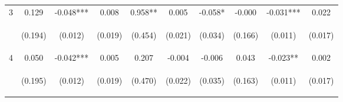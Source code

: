 \begin{tabular}{lccccccccc}
\noalign{\smallskip}3 & 0.129 & -0.048*** & 0.008 & 0.958** & 0.005 & -0.058* & -0.000 & -0.031*** & 0.022\\
 & \begin{footnotesize}(0.194)\end{footnotesize} & \begin{footnotesize}(0.012)\end{footnotesize} & \begin{footnotesize}(0.019)\end{footnotesize} & \begin{footnotesize}(0.454)\end{footnotesize} & \begin{footnotesize}(0.021)\end{footnotesize} & \begin{footnotesize}(0.034)\end{footnotesize} & \begin{footnotesize}(0.166)\end{footnotesize} & \begin{footnotesize}(0.011)\end{footnotesize} & \begin{footnotesize}(0.017)\end{footnotesize}\\
\noalign{\smallskip}4 & 0.050 & -0.042*** & 0.005 & 0.207 & -0.004 & -0.006 & 0.043 & -0.023** & 0.002\\
 & \begin{footnotesize}(0.195)\end{footnotesize} & \begin{footnotesize}(0.012)\end{footnotesize} & \begin{footnotesize}(0.019)\end{footnotesize} & \begin{footnotesize}(0.470)\end{footnotesize} & \begin{footnotesize}(0.022)\end{footnotesize} & \begin{footnotesize}(0.035)\end{footnotesize} & \begin{footnotesize}(0.163)\end{footnotesize} & \begin{footnotesize}(0.011)\end{footnotesize} & \begin{footnotesize}(0.017)\end{footnotesize}\\

\end{tabular}
